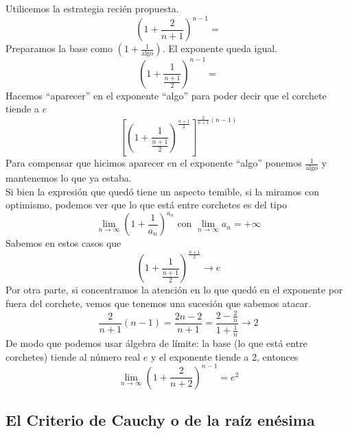 \documentclass[../Teoría.root.tex]{subfiles}
\begin{document}
Utilicemos la estrategia recién propuesta.
\[\left(1+\frac{2}{n+1}\right)^{n-1}=\]
Preparamos la base como \(\left(1+\frac{1}{\text{algo}}\right)\).
El exponente queda igual.
\[\left(1+\frac{1}{\frac{n+1}{2}}\right)^{n-1}=\]
Hacemos ``aparecer'' en el exponente ``algo'' para poder decir que el corchete tiende a \(e\)
\[\left[\left(1+\frac{1}{\frac{n+1}{2}}\right)^{\frac{n+1}{2}}\right]^{\frac{2}{n+1}(n-1)}\]
Para compensar que hicimos aparecer en el exponente ``algo'' ponemos \(\frac{1}{\text{algo}}\) y mantenemos lo que ya estaba.\\
Si bien la expresión que quedó tiene un aspecto temible, si la miramos con optimismo, podemos ver que lo que está entre corchetes es del tipo
\[\lim_{n\to\infty}\left(1+\frac{1}{a_n}\right)^{a_n}\text{ con }\lim_{n\to\infty}a_n=+\infty\]
Sabemos en estos casos que
\[\left(1+\frac{1}{\frac{n+1}{2}}\right)^{\frac{n+1}{2}}\rightarrow e\]
Por otra parte, si concentramos la atención en lo que quedó en el exponente por fuera del corchete, vemos que tenemos una sucesión que sabemos atacar.
\[\frac{2}{n+1}(n-1)=\frac{2n-2}{n+1}=\frac{2-\frac{2}{n}}{1+\frac{1}{n}}\rightarrow2\]
De modo que podemos usar álgebra de límite:
la base (lo que está entre corchetes) tiende al número real \(e\) y el exponente tiende a 2, entonces
\[\lim_{n\to\infty}\left(1+\frac{2}{n+2}\right)^{n-1}=e^2\]
\subsection{El Criterio de Cauchy o de la raíz enésima}
\end{document}
